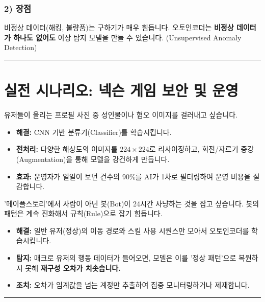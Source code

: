 \documentclass[11pt,a4paper]{book}
\theoremstyle{definition}
\begin{document}
\subsubsection*{2) 장점}
비정상 데이터(해킹, 불량품)는 구하기가 매우 힘듭니다. 오토인코더는 \textbf{비정상 데이터가 하나도 없어도} 이상 탐지 모델을 만들 수 있습니다. (Unsupervised Anomaly Detection)

\vspace{0.5cm}\hrule\vspace{0.5cm}

\section{실전 시나리오: 넥슨 게임 보안 및 운영}

\begin{storybox}[title={Scenario 1: 불건전 프로필 이미지 필터링 (CNN)}]
유저들이 올리는 프로필 사진 중 성인물이나 혐오 이미지를 걸러내고 싶습니다.
\end{storybox}
\begin{itemize}
    \item \textbf{해결:} CNN 기반 분류기(Classifier)를 학습시킵니다.
    \item \textbf{전처리:} 다양한 해상도의 이미지를 $224 \times 224$로 리사이징하고, 회전/자르기 증강(Augmentation)을 통해 모델을 강건하게 만듭니다.
    \item \textbf{효과:} 운영자가 일일이 보던 건수의 90\%를 AI가 1차로 필터링하여 운영 비용을 절감합니다.
\end{itemize}

\begin{storybox}[title={Scenario 2: 작업장(매크로) 탐지 (Autoencoder)}]
'메이플스토리'에서 사람이 아닌 봇(Bot)이 24시간 사냥하는 것을 잡고 싶습니다. 봇의 패턴은 계속 진화해서 규칙(Rule)으로 잡기 힘듭니다.
\end{storybox}
\begin{itemize}
    \item \textbf{해결:} 일반 유저(정상)의 이동 경로와 스킬 사용 시퀀스만 모아서 오토인코더를 학습시킵니다.
    \item \textbf{탐지:} 매크로 유저의 행동 데이터가 들어오면, 모델은 이를 '정상 패턴'으로 복원하지 못해 \textbf{재구성 오차가 치솟습니다.}
    \item \textbf{조치:} 오차가 임계값을 넘는 계정만 추출하여 집중 모니터링하거나 제재합니다.
\end{itemize}

\vspace{0.5cm}\hrule\vspace{0.5cm}
\end{document}
